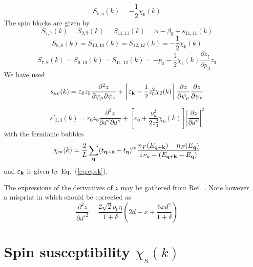 \documentclass[showpacs,amsmath,twocolumn,floatfix]{revtex4-1}
\newcommand\ii{\mathrm{i \,}}
\begin{document}
\begin{equation}
S_{5,5}(k) = - \frac{1}{2} \chi_0(k) 
\end{equation} 
The spin blocks are given by
\begin{equation}
 S_{7,7}(k) = S_{9,9}(k) = S_{11,11}(k) = \alpha - \beta_0 + s_{11,11}(k) \nonumber
\end{equation}
\begin{equation}
 S_{8,8}(k) = S_{10,10}(k) = S_{12,12}(k) = -\frac{1}{2} \chi_0(k) \nonumber
\end{equation}
\begin{equation}
 S_{7,8}(k) = S_{9,10}(k) = S_{11,12}(k) = -p_0 -\frac{1}{2} \chi_1(k) 
 \frac{\partial z_{\uparrow} }{\partial p_3} z_0 
\end{equation}
We have used
\begin{equation}
 s_{\mu\nu}(k) = \varepsilon_0 z_0 \frac{\partial^2 z}{\partial \psi_{\mu} 
 \partial \psi_{\nu}} + \left[ \varepsilon_{{\bf k}} - \frac{1}{2} z_0^2 \chi_2(k) \right] 
 \frac{\partial z}{\partial \psi_{\mu}} \frac{\partial z}{\partial \psi_{\nu}} 
\end{equation}

\begin{equation}
 s'_{3,3}(k) = \varepsilon_0 z_0 \frac{\partial^2 z}{\partial d''\partial d''} 
 + \left[ \varepsilon_{0} + \frac{\nu_n^2}{2 z_0^2} \chi_0(k) \right] 
 \left|\frac{\partial z}{\partial d''} \right|^2 
\end{equation}
with the fermionic bubbles
\begin{equation}
 \chi_m(k) = \frac{2}{L} \sum_{{\bf q }} (t_{{\bf q }+{\bf k}} + t_{{\bf q }})^m 
 \frac{n_F(E_{{\bf q }+{\bf k}}) - n_F(E_{{\bf q }})}
 {\ii \nu_n - (E_{{\bf q }+{\bf k}} - E_{{\bf q }}) }
\end{equation}
and $\varepsilon_{\bf k}$ is given by Eq.~(\ref{eq:epsk}).

The expressions of the derivatives of $z$ may be gathered from Ref.~\cite{li91,Zim97}. 
Note however a misprint in \cite{Zim97} which should be corrected as
\begin{equation}
 \frac{\partial^2z}{\partial {d'}^2} = \frac{2\sqrt{2} p_0 \eta}{1+\delta} \left(2d + x 
 + \frac{6 x d^2}{1+\delta} \right)
\end{equation}



\section{Spin susceptibility $\chi_s(k)$}
\label{app_chi_s}
\end{document}

